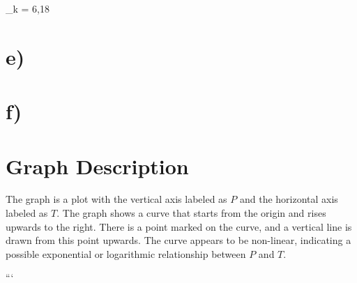 \Rightarrow {}_k = 6,18 \\

\section*{e)}
\section*{f)}

\section*{Graph Description}
The graph is a plot with the vertical axis labeled as \( P \) and the horizontal axis labeled as \( T \). The graph shows a curve that starts from the origin and rises upwards to the right. There is a point marked on the curve, and a vertical line is drawn from this point upwards. The curve appears to be non-linear, indicating a possible exponential or logarithmic relationship between \( P \) and \( T \).

```